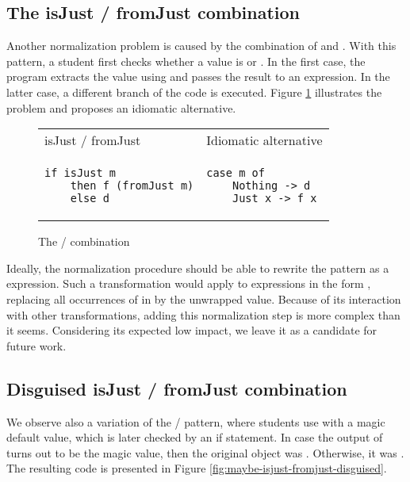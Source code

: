 \subsection{The isJust / fromJust combination}

Another normalization problem is caused by the combination of  and . With this pattern, a student first checks whether a value is  or . In the first case, the program extracts the value using  and passes the result to an expression. In the latter case, a different branch of the code is executed. Figure \ref{fig:maybe-isjust-fromjust} illustrates the problem and proposes an idiomatic alternative.

\begin{figure}
\centering
\begin{tabular}{ m{13em} | m{13em} }
isJust / fromJust & Idiomatic alternative \\
\begin{verbatim}
if isJust m
    then f (fromJust m)
    else d
\end{verbatim}
& \begin{verbatim}
case m of
    Nothing -> d
    Just x -> f x
\end{verbatim}
\end{tabular}
\caption{The  /  combination}
\label{fig:maybe-isjust-fromjust}
\end{figure}

Ideally, the normalization procedure should be able to rewrite the  pattern as a  expression. Such a transformation would apply to expressions in the form , replacing all occurrences of  in  by the unwrapped value. Because of its interaction with other transformations, adding this normalization step is more complex than it seems. Considering its expected low impact, we leave it as a candidate for future work.

\subsection{Disguised isJust / fromJust combination}

We observe also a variation of the  /  pattern, where students use  with a magic default value, which is later checked by an if statement. In case the output of  turns out to be the magic value, then the original  object was . Otherwise, it was . The resulting code is presented in Figure \ref{fig:maybe-isjust-fromjust-disguised}.

